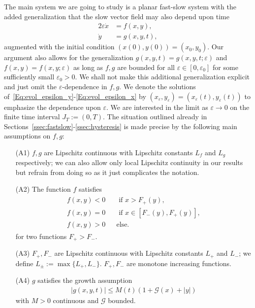 \documentclass[12pt]{article}
\makeatletter
\newcommand{\mylabel}[2]{#2\def\@currentlabel{#2}\label{#1}}
\def\ra{\rightarrow}
\newcommand{\cG}{{\mathcal G}}  %
\makeatother
\begin{document}
The main system we are going to study is a planar fast-slow system with the added 
generalization that the slow vector field may also depend upon time
\begin{alignat}{2}
	\varepsilon \dot{x} &= f(x,y),\label{Eq:evol_epsilon_y}\\
	\dot{y} &= g(x,y,t),\label{Eq:evol_epsilon_x}
\end{alignat}
augmented with the initial condition $(x(0),y(0)) = (x_0,y_0)$. Our
argument also allows for the generalization $g(x,y,t)=g(x,y,t;\varepsilon)$ and 
$f(x,y)=f(x,y;\varepsilon)$ as long as $f,g$ are bounded for all $\varepsilon
\in[0,\varepsilon_0]$ for some sufficiently small $\varepsilon_0>0$. We shall 
not make this additional generalization explicit and just omit the 
$\varepsilon$-dependence in $f,g$. We denote the solutions 
of~\eqref{Eq:evol_epsilon_y}-\eqref{Eq:evol_epsilon_x} by 
$(x_\varepsilon,y_\varepsilon)=(x_\varepsilon(t),y_\varepsilon(t))$ to emphasize 
the dependence upon $\varepsilon$. We are interested in the limit as 
$\varepsilon \ra 0$ on the finite time interval $J_T:=(0,T)$. The situation outlined 
already in Sections~\ref{ssec:fastslow}-\ref{ssec:hysteresis} is made precise by the 
following main assumptions on $f,g$:

\begin{itemize}
		\item[\mylabel{a:fg}{(A1)}] $f,g$ are Lipschitz continuous with 
		Lipschitz constants $L_f$ and $L_g$ respectively; we can also allow
		only local Lipschitz continuity in our results but refrain from 
		doing so as it just complicates the notation.
		\item[\mylabel{a:cm}{(A2)}] The function $f$ satisfies
			\begin{align}
					\begin{matrix}
						f(x,y) < 0 &&\text{ if } x > F_+(y),\\
						f(x,y) = 0 &&\text{ if } x \in [F_-(y),F_+(y)],\\
						f(x,y) > 0 && \text{else}.						
					\end{matrix}\label{Eq:Ass_g}
			\end{align}
			for two functions $F_+ > F_-$.
		\item[\mylabel{a:Fpm}{(A3)}]	$F_+,F_-$ are Lipschitz continuous with 
		Lipschitz constants $L_+$ and $L_-$; we define $L_\pm:=\max\{L_+,L_-\}$. 
		$F_+,F_-$ are monotone increasing functions.
		\item[\mylabel{a:gbound}{(A4)}] $g$ satisfies the growth assumption
			\begin{align}
				|g(x,y,t) | \leq M(t) ( 1+ \cG(x) + |y| )\label{Eq:growth_f}
			\end{align}
			with $M>0$ continuous and $\cG$ bounded.
\end{itemize}
\end{document}
